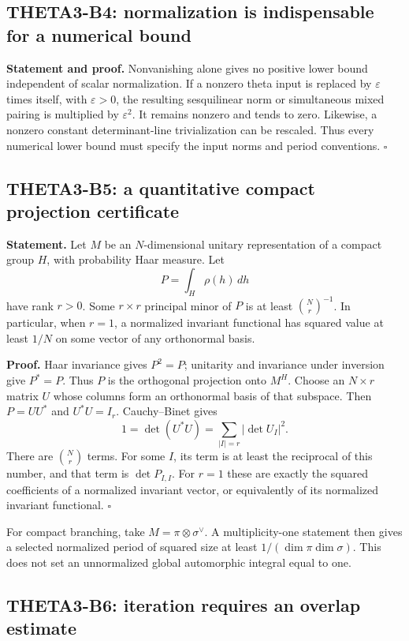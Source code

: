 \documentclass[11pt]{article}
\theoremstyle{definition}\newtheorem{definition}[theorem]{Definition}\newtheorem{remark}[theorem]{Remark}
\begin{document}
\subsection{THETA3-B4: normalization is indispensable for a numerical bound}\label{B4}

\textbf{Statement and proof.} Nonvanishing alone gives no positive lower bound independent of scalar normalization. If a nonzero theta input is replaced by $\varepsilon$ times itself, with $\varepsilon>0$, the resulting sesquilinear norm or simultaneous mixed pairing is multiplied by $\varepsilon^2$. It remains nonzero and tends to zero. Likewise, a nonzero constant determinant-line trivialization can be rescaled. Thus every numerical lower bound must specify the input norms and period conventions. \hfill$\square$

\subsection{THETA3-B5: a quantitative compact projection certificate}\label{B5}

\textbf{Statement.} Let $M$ be an $N$-dimensional unitary representation of a compact group $H$, with probability Haar measure. Let
\[
 P=\int_H\rho(h)\,dh
\]
have rank $r>0$. Some $r\times r$ principal minor of $P$ is at least $\binom Nr^{-1}$. In particular, when $r=1$, a normalized invariant functional has squared value at least $1/N$ on some vector of any orthonormal basis.

\textbf{Proof.} Haar invariance gives $P^2=P$; unitarity and invariance under inversion give $P^*=P$. Thus $P$ is the orthogonal projection onto $M^H$. Choose an $N\times r$ matrix $U$ whose columns form an orthonormal basis of that subspace. Then $P=UU^*$ and $U^*U=I_r$. Cauchy--Binet gives
\[
 1=\det(U^*U)=\sum_{|I|=r}|\det U_I|^2.
\]
There are $\binom Nr$ terms. For some $I$, its term is at least the reciprocal of this number, and that term is $\det P_{I,I}$. For $r=1$ these are exactly the squared coefficients of a normalized invariant vector, or equivalently of its normalized invariant functional. \hfill$\square$

For compact branching, take $M=\pi\otimes\sigma^\vee$. A multiplicity-one statement then gives a selected normalized period of squared size at least $1/(\dim\pi\dim\sigma)$. This does not set an unnormalized global automorphic integral equal to one.

\subsection{THETA3-B6: iteration requires an overlap estimate}\label{B6}
\end{document}
